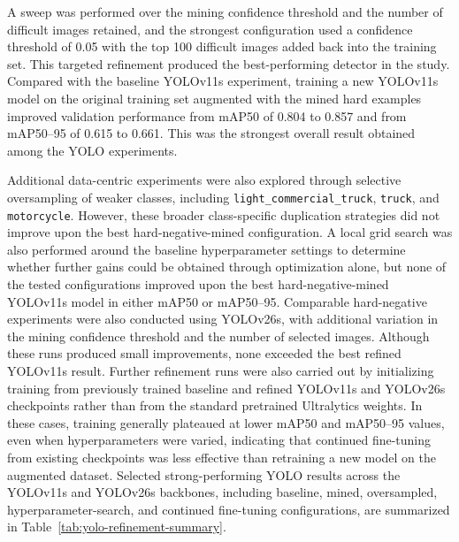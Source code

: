 A sweep was performed over the mining confidence threshold and the number of difficult 
images retained, and the strongest configuration used a confidence threshold of 
0.05 with the top 100 difficult images added back into the training set. This 
targeted refinement produced the best-performing detector in the study. Compared
with the baseline YOLOv11s experiment, training a new YOLOv11s model on the 
original training set augmented with the mined hard examples improved validation
performance from mAP50 of 0.804 to 0.857 and from mAP50--95 of 0.615 to 0.661. This was 
the strongest overall result obtained among the YOLO experiments.

Additional data-centric experiments were also explored through selective oversampling
of weaker classes, including \verb|light_commercial_truck|, \verb|truck|, and \verb|motorcycle|. 
However, these broader class-specific duplication strategies did not improve 
upon the best hard-negative-mined configuration. A local grid search was also 
performed around the baseline hyperparameter settings to determine whether 
further gains could be obtained through optimization alone, but none of the 
tested configurations improved upon the best hard-negative-mined YOLOv11s model 
in either mAP50 or mAP50--95. Comparable hard-negative experiments were also conducted 
using YOLOv26s, with additional variation in the mining confidence threshold 
and the number of selected images. Although these runs produced small improvements,
none exceeded the best refined YOLOv11s result. Further refinement runs were 
also carried out by initializing training from previously trained baseline and 
refined YOLOv11s and YOLOv26s checkpoints rather than from the standard pretrained 
Ultralytics weights. In these cases, training generally plateaued at lower mAP50 
and mAP50--95 values, even when hyperparameters were varied, indicating that continued
fine-tuning from existing checkpoints was less effective than retraining a new 
model on the augmented dataset. Selected strong-performing YOLO results across 
the YOLOv11s and YOLOv26s backbones, including baseline, mined, oversampled, 
hyperparameter-search, and continued fine-tuning configurations, are summarized 
in Table~\ref{tab:yolo-refinement-summary}.

\begingroup
\small
\renewcommand{\arraystretch}{1.15}
\setlength{\tabcolsep}{4pt}

